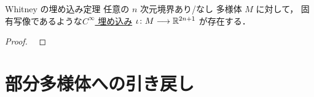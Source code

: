 \documentclass[geometry_main]{subfiles}
\begin{document}


	

\begin{mytheo}[label=thm.Whitney]{Whitney の埋め込み定理}
	任意の $n$ 次元境界あり/なし \cinfty 多様体 $M$ に対して，
    固有写像であるような\hyperref[def:submersion-smooth-appendix]{$C^\infty$ 埋め込み} $\iota \colon M \longrightarrow \mathbb{R}^{2n+1}$ が存在する．
\end{mytheo}

\begin{proof}
    ~\cite[p.134, Theorem 6.15]{Lee12}
\end{proof}


\section{部分多様体への引き戻し}
\end{document}
